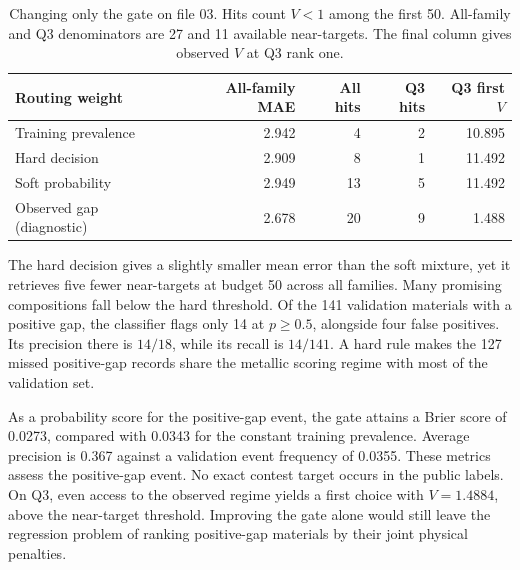 \begin{table}[htbp]
\caption{Changing only the gate on file 03. Hits count $V<1$ among the first 50. All-family and Q3 denominators are 27 and 11 available near-targets. The final column gives observed $V$ at Q3 rank one.}\label{tab:gate}
\centering\small\begin{tabular}{lrrrr}
\toprule Routing weight & All-family MAE & All hits & Q3 hits & Q3 first $V$\\\midrule
Training prevalence & 2.942 & 4 & 2 & 10.895\\
Hard decision & 2.909 & 8 & 1 & 11.492\\
Soft probability & 2.949 & 13 & 5 & 11.492\\
Observed gap (diagnostic) & 2.678 & 20 & 9 & 1.488\\\bottomrule
\end{tabular}
\end{table}

The hard decision gives a slightly smaller mean error than the soft mixture, yet it retrieves five fewer near-targets at budget 50 across all families. Many promising compositions fall below the hard threshold. Of the 141 validation materials with a positive gap, the classifier flags only 14 at $p\geq0.5$, alongside four false positives. Its precision there is $14/18$, while its recall is $14/141$. A hard rule makes the 127 missed positive-gap records share the metallic scoring regime with most of the validation set.

As a probability score for the positive-gap event, the gate attains a Brier score of 0.0273, compared with 0.0343 for the constant training prevalence. Average precision is 0.367 against a validation event frequency of 0.0355. These metrics assess the positive-gap event. No exact contest target occurs in the public labels. On Q3, even access to the observed regime yields a first choice with $V=1.4884$, above the near-target threshold. Improving the gate alone would still leave the regression problem of ranking positive-gap materials by their joint physical penalties.
